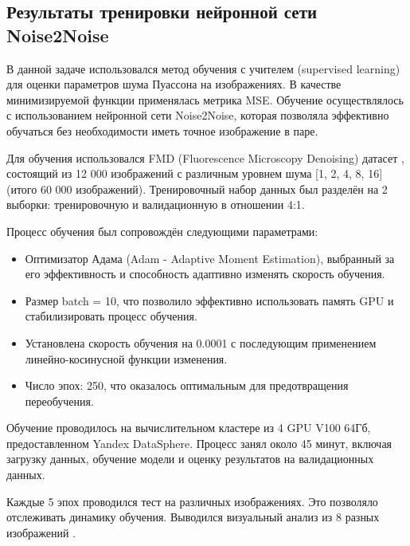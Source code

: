 \subsection{Результаты тренировки нейронной сети Noise2Noise}
\par В данной задаче использовался метод обучения с учителем (supervised learning) для оценки параметров шума Пуассона на изображениях. В качестве минимизируемой функции применялась метрика MSE. Обучение осуществлялось с использованием нейронной сети Noise2Noise, которая позволяла эффективно обучаться без необходимости иметь точное изображение в паре. 
\par Для обучения использовался FMD (Fluorescence Microscopy
Denoising) датасет \cite[с. 4-6]{zhang2019poissongaussian}, состоящий из 12 000 изображений с различным уровнем шума [1, 2, 4, 8, 16] (итого 60 000 изображений). Тренировочный набор данных был разделён на 2 выборки: тренировочную и валидационную в отношении 4:1.
\par Процесс обучения был сопровождён следующими параметрами:
\begin{itemize}[]
	\item Оптимизатор Адама (Adam - Adaptive Moment Estimation)\cite[с. 4-10]{adam2022}, выбранный за его эффективность и способность адаптивно изменять скорость обучения.
	\item Размер batch = 10, что позволило эффективно использовать память GPU и стабилизировать процесс обучения.
	\item Установлена скорость обучения на 0.0001 с последующим применением линейно-косинусной функции изменения.
	\item Число эпох: 250, что оказалось оптимальным для предотвращения переобучения.
\end{itemize}
\par Обучение проводилось на вычислительном кластере из 4 GPU V100 64Гб, предоставленном Yandex DataSphere. Процесс занял около 45 минут, включая загрузку данных, обучение модели и оценку результатов на валидационных данных. 

\par Каждые 5 эпох проводился тест на различных изображениях. Это позволяло отслеживать динамику обучения. Выводился визуальный анализ из 8 разных изображений .

